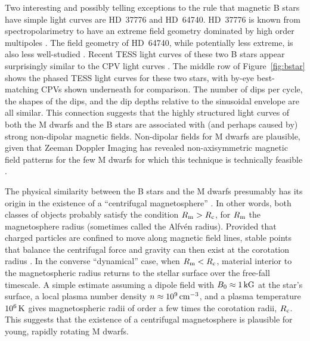 \documentclass[11pt,twocolumn,tighten]{aastex63}
\begin{document}
Two interesting and possibly telling exceptions to the rule that
magnetic B stars have simple light curves are HD~37776 and HD~64740.
HD~37776 is known from spectropolarimetry to have an extreme field
geometry dominated by high order multipoles
\citep{2011ApJ...726...24K}.  The field geometry of HD~64740, while
potentially less extreme, is also less well-studied
\citep[see][Ch.~4]{1988PhDT........53B}.  Recent TESS light curves
of these two B stars appear surprisingly similar to the CPV light
curves \citep{2020pase.conf...46M}.  The middle row of
Figure~\ref{fig:bstar} shows the phased TESS light curves for these
two stars, with by-eye best-matching CPVs shown underneath for
comparison.  The number of dips per cycle, the shapes of the dips, and
the dip depths relative to the sinusoidal envelope are all similar.
This connection suggests that the highly structured light curves of
both the M dwarfs and the B stars are associated with (and perhaps
caused by) strong non-dipolar magnetic fields.  Non-dipolar fields for
M dwarfs are plausible, given that Zeeman Doppler Imaging has revealed
non-axisymmetric magnetic field patterns for the few M dwarfs for
which this technique is technically feasible \citep[see][and
references therein]{2021A&ARv..29....1K}.


The physical similarity between the B stars and the M dwarfs
presumably has its origin in the existence of a ``centrifugal
magnetosphere'' \citep[see][]{2013MNRAS.429..398P}.  In other words,
both classes of objects probably satisfy the condition $R_{\rm m} >
R_{\rm c}$, for $R_{\rm m}$ the magnetosphere radius (sometimes called
the Alfv\'en radius).  Provided that charged particles are confined to
move along magnetic field lines, stable points that balance the
centrifugal force and gravity can then exist at the corotation radius
\citep[e.g.][]{2005MNRAS.357..251T}.  In the converse ``dynamical''
case, when $R_{\rm m} < R_{\rm c}$, material interior to the
magnetospheric radius returns to the stellar surface over the
free-fall timescale.  A simple estimate assuming a dipole field with
$B_0\approx1\,{\rm kG}$ at the star's surface, a local plasma number
density $n\approx10^9\,{\rm cm^{-3}}$, and a plasma temperature
$10^6\,{\rm K}$ gives magnetospheric radii of order a few times the
corotation radii, $R_{\rm c}$.  This suggests that the existence of a
centrifugal magnetosphere is plausible for young, rapidly rotating M
dwarfs.

%
\end{document}
